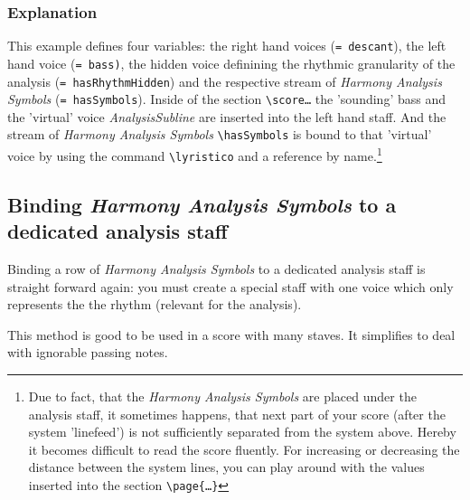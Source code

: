 \documentclass[
  DIV=calc,
  BCOR=5mm,
  12pt,
  headings=small,
  oneside,
  abstract=true,
  toc=bib,
  xcolor=dvipsnames,
  openany,
  ngerman,english]{scrartcl}
\newcommand{\acc}[0]{\textit}
\newcommand{\has}[1]{\textit{Harmony Analysis Symbol#1}}
\begin{document}
\subsubsection{Explanation}

This example defines four variables: the right hand voices (\texttt{= descant}),
the left hand voice (\texttt{= bass)}, the hidden voice definining the rhythmic
granularity of the analysis (\texttt{= hasRhythmHidden}) and the respective
stream of \has{s} (\texttt{= hasSymbols}). Inside of the section
\texttt{\textbackslash score{\ldots}} the 'sounding' bass and the 'virtual'
voice \acc{AnalysisSubline} are inserted into the left hand staff. And the
stream of \has{s} \texttt{\textbackslash hasSymbols} is bound to that 'virtual'
voice by using the command \texttt{\textbackslash lyristico} and a reference by
name.\footnote{Due to fact, that the \has{s} are placed under the analysis
staff, it sometimes happens, that next part of your score (after the system
'linefeed') is not sufficiently separated from the system above. Hereby it
becomes difficult to read the score fluently. For increasing or decreasing the
distance between the system lines, you can play around with the values inserted
into the section \texttt{\textbackslash page\{\ldots\}}}


\subsection{Binding \has{s} to a dedicated analysis staff}

Binding a row of \has{s} to a dedicated analysis staff is straight forward
again: you must create a special staff with one voice which only represents the
the rhythm (relevant for the analysis). 

This method is good to be used in a score with many staves. It simplifies to deal
with ignorable passing notes.
\end{document}
